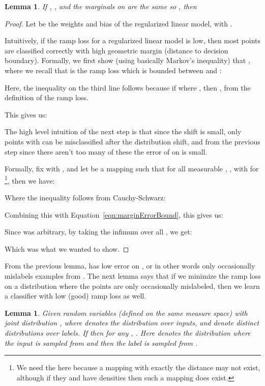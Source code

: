 \documentclass[11pt]{article}
\newtheorem{lemma}[theorem]{Lemma}
\begin{document}
\begin{lemma}
\label{lem:boundErrorFromMargin}
If , , and the marginals on  are the same so , then  
\end{lemma}

\begin{proof}
Let  be the weights and bias of the regularized linear model, with .

Intuitively, if the ramp loss for a regularized linear model is low, then most points are classified correctly with high geometric margin (distance to decision boundary). Formally, we first show (using basically Markov's inequality) that , where we recall that  is the ramp loss which is bounded between  and :

Here, the inequality on the third line follows because if  where , then , from the definition of the ramp loss.

This gives us:


The high level intuition of the next step is that since the shift is small, only points  with  can be misclassified after the distribution shift, and from the previous step since there aren't too many of these the error of  on  is small.

Formally, fix  with , and let  be a mapping such that for all measurable , , with  for \footnote{We need the  here because a mapping with exactly the  distance may not exist, although if they  and  have densities then such a mapping does exist.}, then we have:


Where the inequality follows from Cauchy-Schwarz:


Combining this with Equation~\eqref{eqn:marginErrorBound}, this gives us:

Since  was arbitrary, by taking the infimum over all , we get:

Which was what we wanted to show.

\end{proof}

From the previous lemma,  has low error on , or in other words only occasionally mislabels examples from . The next lemma says that if we minimize the ramp loss on a distribution where the points are only occasionally mislabeled, then we learn a classifier with low (good) ramp loss as well.

\begin{lemma}
\label{lem:boundMarginFromError}
Given random variables  (defined on the same measure space) with joint distribution , where  denotes the distribution over inputs, and  denote distinct distributions over labels. If  then for any , . Here  denotes the distribution where the input  is sampled from  and then the label is sampled from .
\end{lemma}
\end{document}
